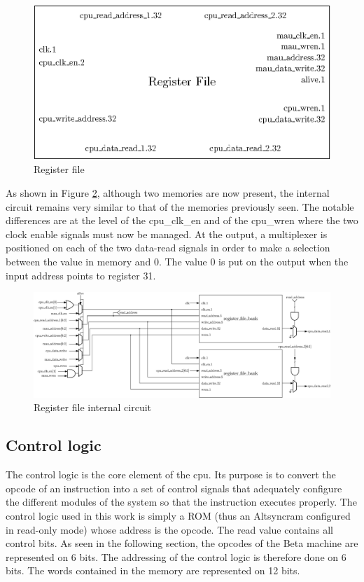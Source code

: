 \begin{figure}[H]
    \centering
    \includegraphics[scale=0.6]{Chapter3-CPU/res/reg_file}
    \caption{Register file}
    \label{fig:components/rf}
\end{figure}

As shown in Figure \ref{fig:components/rf_in}, although two memories are now present, the internal 
circuit remains very similar to that of the memories previously seen. The notable differences are at 
the level of the cpu\_clk\_en and of the cpu\_wren where the two clock enable signals 
must now be managed. At the output, a multiplexer is positioned on each of the two data-read signals in 
order to make a selection between the value in memory and 0. The value 0 is put on the output when 
the input address points to register 31.

\begin{figure}[H]
    \centering
    \includegraphics[width=\linewidth]{Chapter3-CPU/res/reg_file_in}
    \caption{Register file internal circuit}
    \label{fig:components/rf_in}
\end{figure}

\subsection{Control logic}

The control logic is the core element of the cpu. Its purpose is to convert the opcode of an 
instruction into a set of control signals that adequately configure the different modules of 
the system so that the instruction executes properly. The control logic used in this work is simply a 
ROM (thus an Altsyncram configured in read-only mode) whose address is the opcode. The read value 
contains all control bits. As seen in the following section, the opcodes of the Beta 
machine are represented on 6 bits. The addressing of the control logic is therefore done on 6 bits. 
The words contained in the memory are represented on 12 bits.

